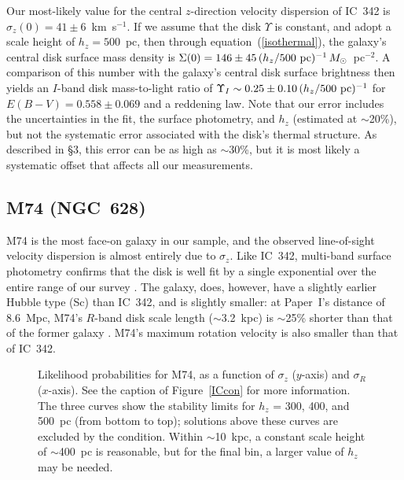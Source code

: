 \documentclass[12pt,preprint]{emulateapj}
\newcommand{\kms}{km~s$^{-1}$}
\begin{document}
Our most-likely value for the central $z$-direction velocity dispersion of IC~342 is $\sigma_z(0) = 41 \pm 6$~\kms.  If we assume that the disk $\Upsilon$ is constant, and adopt a scale height of $h_z = 500$~pc, then through equation~(\ref{isothermal}), the galaxy's central disk surface mass density is $\Sigma(0) = 146 \pm 45 \, (h_z / 500~{\rm pc})^{-1} \, M_{\odot}$~pc$^{-2}$.  A comparison of this number with the galaxy's central disk surface brightness \citep[$\mu_I(0) = 19.6 \pm 0.2$;][]{wb03} then yields an $I$-band disk mass-to-light ratio of $\Upsilon_I \sim 0.25 \pm 0.10 \, (h_z / 500~{\rm pc})^{-1}$ for $E(B-V) = 0.558 \pm 0.069$ \citep{sfd98} and a \citet{ccm89} reddening law.  Note that our error includes the uncertainties in the fit, the surface photometry, and $h_z$ (estimated at $\sim$20\%), but not the systematic error associated with the disk's thermal structure.  As described in \S3, this error can be as high as $\sim$30\%, but it is most likely a systematic offset that affects all our measurements.  

\subsection{M74 (NGC~628)}
M74 is the most face-on galaxy in our sample, and the observed line-of-sight velocity dispersion is almost entirely due to $\sigma_z$.  Like IC~342, multi-band surface photometry confirms that the disk is well fit by a single exponential over the entire range of our survey \citep{npr92, khc06}.  The galaxy, does, however, have a slightly earlier Hubble type (Sc) than IC~342, and is slightly smaller:  at Paper~I's distance of 8.6~Mpc, M74's $R$-band disk scale length ($\sim$3.2~kpc) is $\sim$25\% shorter than that of the former galaxy \citep{m04}.  M74's maximum rotation velocity is also smaller than that of IC~342.

\begin{figure}
\caption{\scriptsize Likelihood probabilities for M74, as a function of $\sigma_z$ ($y$-axis) and $\sigma_R$ ($x$-axis).  See the caption of Figure~\ref{ICcon} for more information.  The three curves show the stability limits for $h_z$ = 300, 400, and 500~pc (from bottom to top); solutions above these curves are excluded by the \citet{t64} condition.  Within $\sim$10~kpc, a constant scale height of $\sim$400~pc is reasonable, but for the final bin, a larger value of $h_z$ may be needed. \label{M74con} }
\end{figure}
\end{document}
